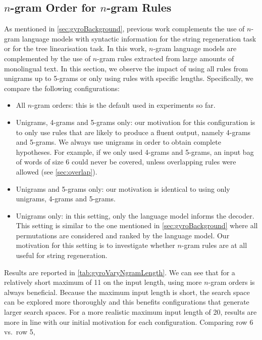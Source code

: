 
\subsection{$n$-gram Order for $n$-gram Rules}
\label{sec:gyroEffectNgramOrder}

As mentioned in \autoref{sec:gyroBackground}, previous
work complements the use of $n$-gram language models with
syntactic information for the string regeneration task or for the tree
linearisation task. In this work, $n$-gram language models are complemented
by the use of $n$-gram rules extracted from large amounts of monolingual text.
In this section, we observe the impact of using all rules from unigrams
up to 5-grams or only using rules with specific lengths.
Specifically, we compare the following configurations:
%
\begin{itemize}
  \item All $n$-gram orders: this is the default used in experiments so far.
  \item Unigrams, 4-grams and 5-grams only: our motivation for this configuration
    is to only use rules that are likely to produce a fluent output, namely 4-grams
    and 5-grams. We always use unigrams in order to obtain complete hypotheses.
    For example, if we only used 4-grams and 5-grams, an
    input bag of words of size 6 could
    never be covered, unless overlapping rules were allowed (see \autoref{sec:overlap}).
  \item Unigrams and 5-grams only: our motivation is identical to using
    only unigrams, 4-grams and 5-grams.
  \item Unigrams only: in this setting, only the language model
    informs the decoder. This setting is similar to the one mentioned
    in \autoref{sec:gyroBackground} where all permutations are considered
    and ranked by the language model. Our motivation for this setting is to
    investigate whether $n$-gram rules are at all useful for string regeneration.
\end{itemize}
%
Results
are reported in \autoref{tab:gyroVaryNgramLength}.
We can see that for a relatively short maximum of 11 on the input length,
using more $n$-gram orders is always beneficial.
Because the maximum input length is short, the search space can be
explored more thoroughly and this benefits configurations that generate
larger search spaces.
For a more realistic maximum input length of 20, results are more in line
with our initial motivation for each configuration. Comparing row 6 vs.\ row 5,
